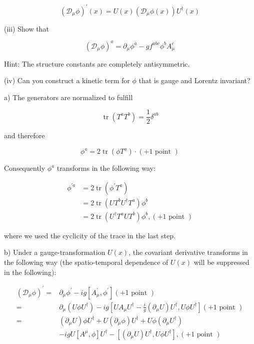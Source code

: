 \documentclass[10pt, letterpaper]{article}
\begin{document}
$$
\left(\mathcal{D}_\mu \phi\right)^{\prime}(x)=U(x)\left(\mathcal{D}_\mu \phi(x)\right) U^{\dagger}(x)
$$

(iii) Show that

$$
\left(\mathcal{D}_\mu \phi\right)^a=\partial_\mu \phi^a-g f^{a b c} \phi^b A_\mu^c
$$


Hint: The structure constants are completely antisymmetric.

(iv) Can you construct a kinetic term for $\phi$ that is gauge and Lorentz invariant?



a) The generators are normalized to fulfill

$$
\operatorname{tr}\left(T^a T^b\right)=\frac{1}{2} \delta^{a b}
$$

and therefore

$$
\phi^a=2 \operatorname{tr}\left(\phi T^a\right) \cdot(+1 \text { point })
$$


Consequently $\phi^a$ transforms in the following way:

$$
\begin{aligned}
\phi^{\prime a} & =2 \operatorname{tr}\left(\phi^{\prime} T^a\right) \\
& =2 \operatorname{tr}\left(U T^b U^{\dagger} T^a\right) \phi^b \\
& =2 \operatorname{tr}\left(U^{\dagger} T^a U T^b\right) \phi^b,(+1 \text { point })
\end{aligned}
$$

where we used the cyclicity of the trace in the last step.



b) Under a gauge-transformation $U(x)$, the covariant derivative transforms in the following way (the spatio-temporal dependence of $U(x)$ will be suppressed in the following):

$$
\begin{aligned}
\left(\mathcal{D}_\mu \phi\right)^{\prime}= & \partial_\mu \phi^{\prime}-i g\left[A_\mu^{\prime}, \phi^{\prime}\right](+1 \text { point }) \\
= & \partial_\mu\left(U \phi U^{\dagger}\right)-i g\left[U A_\mu U^{\dagger}-\frac{i}{g}\left(\partial_\mu U\right) U^{\dagger}, U \phi U^{\dagger}\right](+1 \text { point }) \\
= & \left(\partial_\mu U\right) \phi U^{\dagger}+U\left(\partial_\mu \phi\right) U^{\dagger}+U \phi\left(\partial_\mu U^{\dagger}\right) \\
& -i g U\left[A^\mu, \phi\right] U^{\dagger}-\left[\left(\partial_\mu U\right) U^{\dagger}, U \phi U^{\dagger}\right],(+1 \text { point })
\end{aligned}
$$
\end{document}
